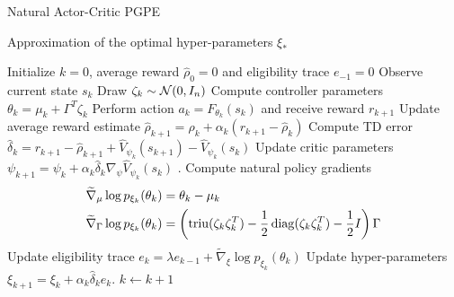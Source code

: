 \begin{algorithm}[t!]
	\caption{Natural Actor-Critic PGPE}
	\label{algo:NACPGPE}
	\begin{algorithmic}[0]
		\Ensure Approximation of the optimal hyper-parameters $\xi_*$
		\begin{algorithmic}[1]
		\State Initialize $k = 0$, average reward $\widehat{\rho}_0 = 0$ and eligibility trace $e_{-1} = 0$
		\Repeat
			\State Observe current state $s_k$
			\State Draw $\zeta_k \sim \mathcal{N}(0, I_n)$
			\State Compute controller parameters $\theta_k = \mu_k + \Gamma^T \zeta_k$
			\State Perform action $a_k = F_{\theta_k}(s_k)$ and receive reward $r_{k+1}$
			\State Update average reward estimate $\widehat{\rho}_{k+1} = \widehat{\rho}_{k} + \alpha_k (r_{k+1} - \widehat{\rho}_{k})$
			\State Compute TD error $\widehat{\delta}_k = r_{k+1} - \widehat{\rho}_{k+1} + \widehat{V}_{\psi_k}(s_{k+1}) - \widehat{V}_{\psi_k}(s_k)$
			\State Update critic parameters $	\psi_{k+1} = \psi_k + \alpha_k \widehat{\delta}_k \nabla_\psi \widehat{V}_{\psi_k}(s_k)$ . 
			\State Compute natural policy gradients
				\begin{equation*}
					\begin{split}
						\widetilde{\nabla}_\mu \log p_{\xi_k}(\theta_k) &= \theta_k - \mu_k\\
						\widetilde{\nabla}_\Gamma \log p_{\xi_k}(\theta_k) &= \left(\operatorname{triu}(\zeta_k \zeta_k^T) - \frac{1}{2} \operatorname{diag}(\zeta_k \zeta_k^T) - \frac{1}{2} I \right) \Gamma
					\end{split}
				\end{equation*}
			\State Update eligibility trace $e_{k} = \lambda e_{k-1} + \widetilde{\nabla}_\xi \log p_{\xi_k}(\theta_k)$
			\State Update hyper-parameters $\xi_{k+1} = \xi_k + \alpha_k \widehat{\delta}_k e_k$. 
			\State $k \leftarrow k + 1$
		\end{algorithmic}
	\end{algorithmic}
\end{algorithm}  
\clearpage
